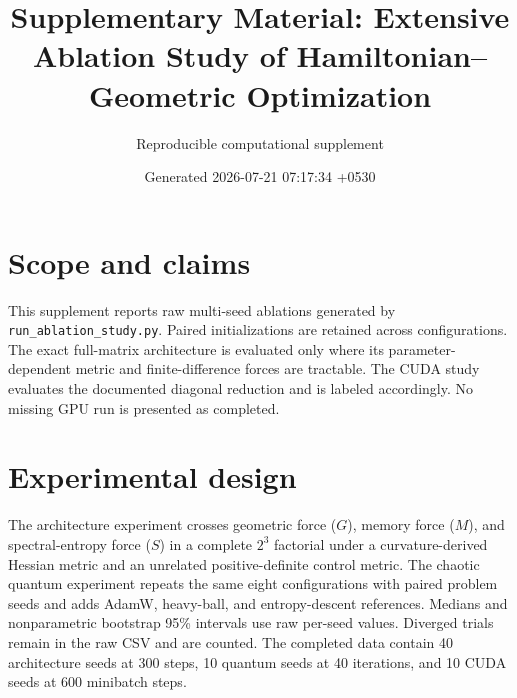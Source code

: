 \documentclass[10pt]{article}
\title{Supplementary Material: Extensive Ablation Study of Hamiltonian--Geometric Optimization}
\author{Reproducible computational supplement}
\date{Generated 2026-07-21 07:17:34 +0530}
\begin{document}
\maketitle
\section{Scope and claims}
This supplement reports raw multi-seed ablations generated by
\texttt{run\_ablation\_study.py}.  Paired initializations are retained across
configurations.  The exact full-matrix architecture is evaluated only where
its parameter-dependent metric and finite-difference forces are tractable.
The CUDA study evaluates the documented diagonal reduction and is labeled
accordingly.  No missing GPU run is presented as completed.

\section{Experimental design}
The architecture experiment crosses geometric force ($G$), memory force
($M$), and spectral-entropy force ($S$) in a complete $2^3$ factorial under a
curvature-derived Hessian metric and an unrelated positive-definite control
metric.  The chaotic quantum experiment repeats the same eight configurations
with paired problem seeds and adds AdamW, heavy-ball, and entropy-descent
references.  Medians and nonparametric bootstrap 95\% intervals use raw
per-seed values.  Diverged trials remain in the raw CSV and are counted.
The completed data contain 40
architecture seeds at 300 steps,
10 quantum seeds at
40 iterations, and
10 CUDA seeds at
600 minibatch steps.
\end{document}
